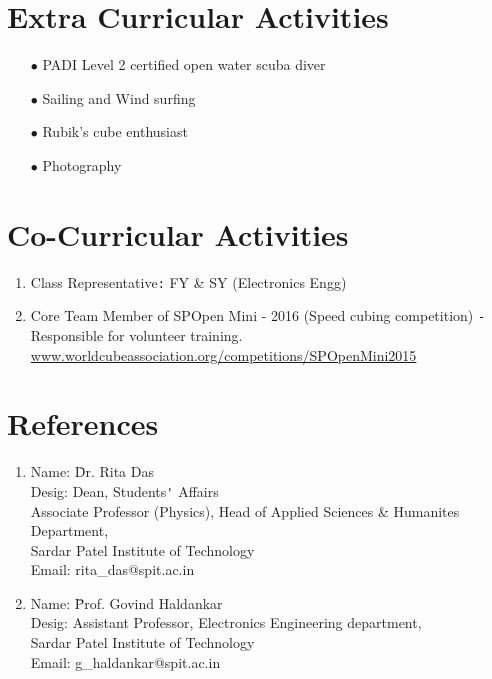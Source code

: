 \documentclass{article}
\begin{document}
	\section*{Extra Curricular Activities}
	\begin{itemize}
		\item[$\bullet$] PADI Level 2 certified open water scuba diver
		\item[$\bullet$] Sailing and Wind surfing
		\item[$\bullet$] Rubik’s cube enthusiast 
		\item[$\bullet$] Photography 
	\end{itemize}
	
	\section*{Co-Curricular Activities}
	\begin{enumerate}
		\item Class Representative\verb|:| FY \& SY (Electronics Engg) 
		\item Core Team Member of SPOpen Mini - 2016 (Speed cubing competition) \verb|-|Responsible for volunteer training.\\
		\url{www.worldcubeassociation.org/competitions/SPOpenMini2015}
	\end{enumerate}
		
	\section*{References}
	\begin{enumerate}
		\item
		\begin{tabbing}
			Name: 		 \=Dr. Rita Das\\ 
			Desig: \>Dean, Students\verb|'| Affairs\\
			\>Associate Professor (Physics), Head of Applied Sciences \& Humanites Department,\\
			\>Sardar Patel Institute of Technology\\
			Email: \>rita\_das@spit.ac.in\\ 
		\end{tabbing}
		
		\item
		\begin{tabbing}
			Name: 	 \=Prof. Govind Haldankar\\
			Desig:
			\>Assistant Professor, Electronics Engineering department,\\
			\>Sardar Patel Institute of Technology\\  
			Email: \>g\_haldankar@spit.ac.in\\ 
		\end{tabbing}	
		
	\end{enumerate}
	
\end{document}
